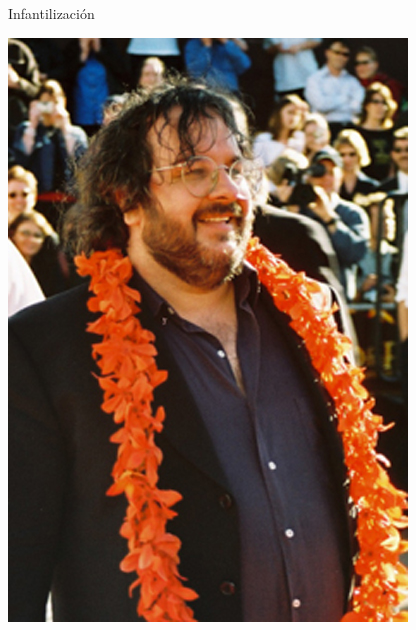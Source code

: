 \documentclass[green, compress]{beamer}
\begin{document}
\begin{frame}{Infantilización}
  \begin{center}
    \includegraphics[scale=.3]{imagenes/Peter_Jackson01.jpg}
  \end{center}
\end{frame}
\end{document}
